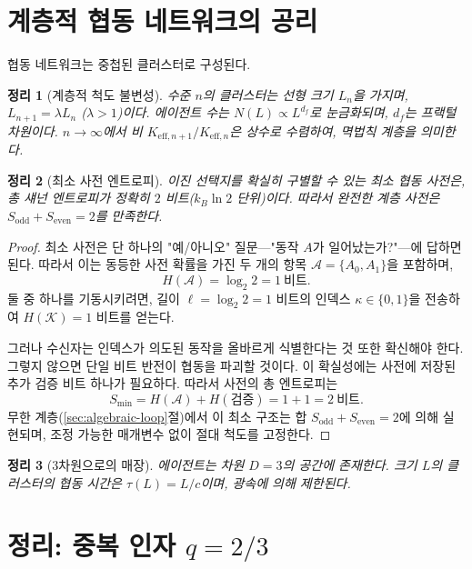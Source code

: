 \documentclass[12pt,a4paper]{article}
\newtheorem{theorem}{정리}[section]
\begin{document}
	\section{계층적 협동 네트워크의 공리}
	
	협동 네트워크는 중첩된 클러스터로 구성된다.
	
	\begin{theorem}[계층적 척도 불변성] \label{ax:A1}
		수준 \(n\)의 클러스터는 선형 크기 \(L_n\)을 가지며, \(L_{n+1} = \lambda L_n\) (\(\lambda > 1\))이다. 에이전트 수는 \(N(L) \propto L^{d_f}\)로 눈금화되며, \(d_f\)는 프랙털 차원이다. \(n \to \infty\)에서 비 \(K_{\mathrm{eff},n+1}/K_{\mathrm{eff},n}\)은 상수로 수렴하여, 멱법칙 계층을 의미한다.
	\end{theorem}
	
	\begin{theorem}[최소 사전 엔트로피]
		\label{thm:minimal-dict}
		이진 선택지를 확실히 구별할 수 있는 최소 협동 사전은, 총 섀넌 엔트로피가 정확히 \(2\) 비트(\(k_B\ln 2\) 단위)이다. 따라서 완전한 계층 사전은 \(S_{\mathrm{odd}} + S_{\mathrm{even}} = 2\)를 만족한다.
	\end{theorem}
	
	\begin{proof}
		최소 사전은 단 하나의 "예/아니오" 질문—"동작 \(A\)가 일어났는가?"—에 답하면 된다. 따라서 이는 동등한 사전 확률을 가진 두 개의 항목 \(\mathcal{A} = \{A_0, A_1\}\)을 포함하며,
		\[
		H(\mathcal{A}) = \log_2 2 = 1\ \text{비트}.
		\]
		둘 중 하나를 기동시키려면, 길이 \(\ell = \log_2 2 = 1\) 비트의 인덱스 \(\kappa \in \{0,1\}\)을 전송하여 \(H(\mathcal{K}) = 1\) 비트를 얻는다.
		
		그러나 수신자는 인덱스가 의도된 동작을 올바르게 식별한다는 것 또한 확신해야 한다. 그렇지 않으면 단일 비트 반전이 협동을 파괴할 것이다. 이 확실성에는 사전에 저장된 추가 검증 비트 하나가 필요하다. 따라서 사전의 총 엔트로피는
		\[
		S_{\min} = H(\mathcal{A}) + H(\text{검증}) = 1 + 1 = 2\ \text{비트}.
		\]
		무한 계층(\ref{sec:algebraic-loop}절)에서 이 최소 구조는 합 \(S_{\mathrm{odd}} + S_{\mathrm{even}} = 2\)에 의해 실현되며, 조정 가능한 매개변수 없이 절대 척도를 고정한다.
	\end{proof}
	
	\begin{theorem}[3차원으로의 매장] \label{ax:A3}
		에이전트는 차원 \(D = 3\)의 공간에 존재한다. 크기 \(L\)의 클러스터의 협동 시간은 \(\tau(L) = L/c\)이며, 광속에 의해 제한된다.
	\end{theorem}
	
	
	\section{정리: 중복 인자 \(q = 2/3\)}
	
\end{document}
